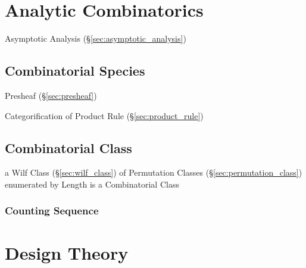 \section{Analytic Combinatorics}\label{sec:analytic_combinatorics}
\cite{flajolet-sedgewick09}

Asymptotic Analysis (\S\ref{sec:asymptotic_analysis})



\subsection{Combinatorial Species}\label{sec:combinatorial_species}

Presheaf (\S\ref{sec:presheaf})

Categorification of Product Rule (\S\ref{sec:product_rule}) %



\subsection{Combinatorial Class}\label{sec:combinatorial_class}

a Wilf Class (\S\ref{sec:wilf_class}) of Permutation Classes
(\S\ref{sec:permutation_class}) enumerated by Length is a Combinatorial Class



\subsubsection{Counting Sequence}\label{sec:counting_sequence}



\section{Design Theory}\label{sec:combinatorial_design}

